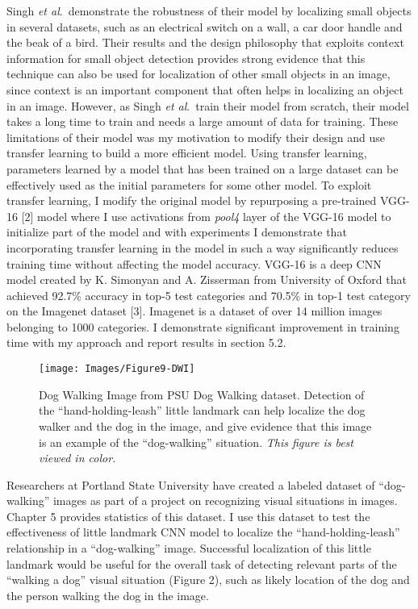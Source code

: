 \documentclass [11pt,letterpaper ,twoside ,openany ]{report}
\begin{document}
    Singh \textit {et al}.\ demonstrate the robustness of their model by localizing small objects in several datasets, such as an electrical switch on a wall, a car door handle and the beak of a bird. Their results and the design philosophy that exploits context information for small object detection provides strong evidence that this technique can also be used for localization of other small objects in an image, since context is an important component that often helps in localizing an object in an image. However, as Singh \textit{et al}.\ train their model from scratch, their model takes a long time to train and needs a large amount of data for training. These limitations of their model was my motivation to modify their design and use transfer learning to build a more efficient model. Using transfer learning, parameters learned by a model that has been trained on a large dataset can be effectively used as the initial parameters for some other model. To exploit transfer learning, I modify the original model by repurposing a pre-trained VGG-16 [2] model where I use activations from \textit{pool4} layer of the VGG-16 model to initialize part of the model and with experiments I demonstrate that incorporating  transfer learning in the model in such a way significantly reduces training time without affecting the model accuracy. VGG-16 is a deep CNN model created by K. Simonyan and A. Zisserman from University of Oxford that achieved 92.7\% accuracy in top-5 test categories and 70.5\% in top-1 test category on the Imagenet dataset [3]. Imagenet is a dataset of over 14 million images belonging to 1000 categories. I demonstrate significant improvement in training time with my approach and report results in section 5.2.

    \begin{wrapfigure}{l}[9mm]{0.5\textwidth}
        \begin{center}
            \texttt{[image: Images/Figure9-DWI]}
        \end{center}
        \caption{Dog Walking Image from PSU Dog Walking dataset. Detection of the ``hand-holding-leash'' little landmark can help localize the dog walker and the dog in the image, and give evidence that this image is an example of the ``dog-walking'' situation. \textit{This figure is best viewed in color.}}
    \end{wrapfigure}    

    Researchers at Portland State University have created a labeled dataset of ``dog-walking'' images as part of a project on recognizing visual situations in images. Chapter 5 provides statistics of this dataset. I use this dataset to test the effectiveness of little landmark CNN model to localize the ``hand-holding-leash'' relationship in a ``dog-walking'' image. Successful localization of this little landmark would be useful for the overall task of detecting relevant parts of the ``walking a dog'' visual situation (Figure 2), such as likely location of the dog and the person walking the dog in the image.
\end{document}
